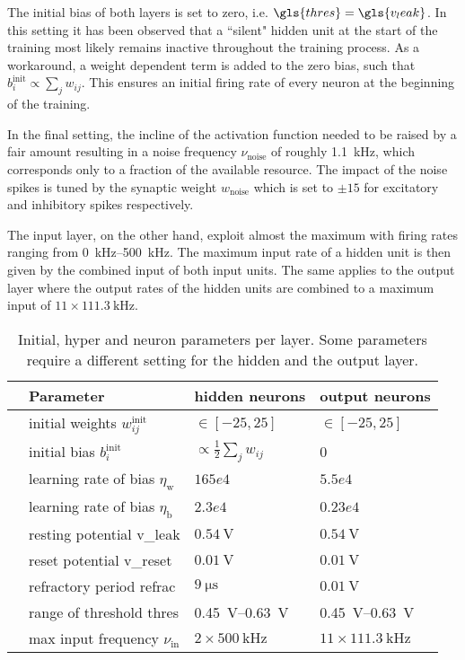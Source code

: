 The initial bias of both layers is set to zero, i.e. $\gls{thres} = \gls{v_leak}$. In this setting it has been observed that a ``silent" hidden unit at the start of the training most likely remains inactive throughout the training process. As a workaround, a weight dependent term is added to the zero bias, such that $b_i^\text{init} \propto \sum_j w_{ij}$. This ensures an initial firing rate of every neuron at the beginning of the training.

In the final setting, the incline of the activation function needed to be raised by a fair amount resulting in a noise frequency $\nu_\text{noise}$ of roughly \SI{1.1}{\kilo \Hz}, which corresponds only to a fraction of the available resource. The impact of the noise spikes is tuned by the synaptic weight $w_\text{noise}$ which is set to $\pm 15$ for excitatory and inhibitory spikes respectively.

The input layer, on the other hand, exploit almost the maximum with firing rates ranging from \SIrange{0}{500}{\kilo \Hz}. The maximum input rate of a hidden unit is then given by the combined input of both input units. The same applies to the output layer where the output rates of the hidden units are combined to a maximum input of $11 \times \SI{111.3}{\kilo \Hz}$.

\begin{table}\centering{}
	\begin{tabular}{@{}rlll@{}}\toprule
		& Parameter								& 	hidden neurons 			& 	output neurons 	\\ \midrule
		& initial weights $w_{ij}^\text{init}$	& 	 $\in[-25, 25]$			&	$\in[-25, 25]$	\\
		& initial bias $b_{i}^\text{init}$		& $\propto \frac{1}{2} \sum_j w_{ij}$ &	0		\\
		& learning rate of bias  $\eta_\text{w}$&	$165e4$					& 	$5.5e4$			\\
		& learning rate of bias  $\eta_\text{b}$&	$2.3e4$					& 	$0.23e4$		\\
		& resting potential \gls{v_leak}		&	$\SI{0.54}{\V}$ 		& 	$\SI{0.54}{\V}$	\\
		& reset potential \gls{v_reset}			&	$\SI{0.01}{\V}$			& 	$\SI{0.01}{\V}$	\\
		& refractory period \gls{refrac}		&	$\SI{9}{\micro \s}$			& 	$\SI{0.01}{\V}$	\\
		& range of threshold \gls{thres} 				&	\SIrange{0.45}{0.63}{\V}&	\SIrange{0.45}{0.63}{\V}\\
		& max input frequency $\nu_{\text{in}}$	&	$2 \times \SI{500}{\kilo \Hz}$	& $11 \times \SI{111.3}{\kilo\Hz}$	\\
		\bottomrule
	\end{tabular}
	\caption[Initial, hyper and neuron parameters per layer.]{Initial, hyper and neuron parameters per layer. Some parameters require a different setting for the hidden and the output layer.}
	\label{circlesinitparameters}
\end{table}

